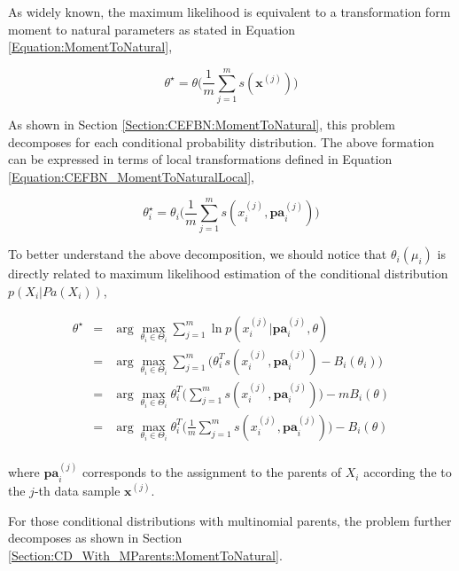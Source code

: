 \documentclass[11pt, oneside]{article}   	%
\newcommand{\bm}{\mathbf}
\numberwithin{figure}{section}
\numberwithin{equation}{section}
\numberwithin{table}{section}
\theoremstyle{definition}
\begin{document}
As widely known, the maximum likelihood is equivalent to a transformation form moment to natural parameters as stated in Equation \ref{Equation:MomentToNatural}, 

$$\theta^\star = \theta\Big(\frac{1}{m}\sum_{j=1}^m s(\bm x^{(j)})\Big)$$

As shown in Section \ref{Section:CEFBN:MomentToNatural}, this problem decomposes for each conditional probability distribution.  The above formation can be expressed in terms of local transformations defined in Equation \ref{Equation:CEFBN_MomentToNaturalLocal}, 

$$\theta_i^\star = \theta_i\Big(\frac{1}{m}\sum_{j=1}^m s(x_i^{(j)},\bm{pa}^{(j)}_i)\Big)$$


To better understand the above decomposition, we should notice that $\theta_i(\mu_i)$ is directly related to maximum likelihood estimation of the conditional distribution $p(X_i|Pa(X_i))$, 

\begin{eqnarray*}
\theta^\star  &=& \arg\max_{\theta_i \in \Theta_i} \sum_{j=1}^m \ln p(x_i^{(j)}|\bm{pa}^{(j)}_i,\theta) \\
&=& \arg\max_{\theta_i \in \Theta_i} \sum_{j=1}^m \Big(\theta_i^Ts(x_i^{(j)},\bm{pa}^{(j)}_i)  - B_i(\theta_i) \Big)\\
&=& \arg\max_{\theta_i \in \Theta_i} \theta_i^T\Big(\sum_{j=1}^m s(x_i^{(j)},\bm{pa}^{(j)}_i) \Big)  - m B_i(\theta) \\
&=& \arg\max_{\theta_i \in \Theta_i} \theta_i^T\Big(\frac{1}{m}\sum_{j=1}^m s(x_i^{(j)},\bm{pa}^{(j)}_i) \Big)  - B_i(\theta) \\
\end{eqnarray*}

\noindent where $\bm{pa}^{(j)}_i$ corresponds to the assignment to the parents of $X_i$ according the to the $j$-th data sample $\bm x^{(j)}$.

For those conditional distributions with multinomial parents, the problem further decomposes as shown in Section \ref{Section:CD_With_MParents:MomentToNatural}. 
\end{document}
